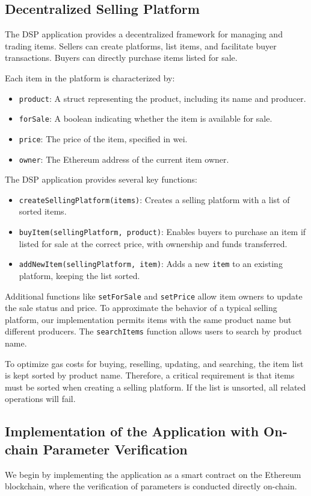 \documentclass[runningheads]{llncs}
\begin{document}
\subsection{Decentralized Selling Platform}
The DSP application provides a decentralized framework for managing and trading items. Sellers can create platforms, list items, and facilitate buyer transactions. Buyers can directly purchase items listed for sale.

Each item in the platform is characterized by:
\begin{itemize}
    \item \texttt{product}: A struct representing the product, including its name and producer.
    \item \texttt{forSale}: A boolean indicating whether the item is available for sale.
    \item \texttt{price}: The price of the item, specified in wei.
    \item \texttt{owner}: The Ethereum address of the current item owner.
\end{itemize}
The DSP application provides several key functions:
\begin{itemize}
    \item \texttt{createSellingPlatform(items)}: Creates a selling platform with a list of sorted items.
    \item \texttt{buyItem(sellingPlatform, product)}: Enables buyers to purchase an item if listed for sale at the correct price, with ownership and funds transferred.
    \item \texttt{addNewItem(sellingPlatform, item)}: Adds a new \texttt{item} to an existing platform, keeping the list sorted.
\end{itemize}
Additional functions like \texttt{setForSale} and \texttt{setPrice} allow item owners to update the sale status and price. To approximate the behavior of a typical selling platform, our implementation permits items with the same product name but different producers. The \texttt{searchItems} function allows users to search by product name.

To optimize gas costs for buying, reselling, updating, and searching, the item list is kept sorted by product name. Therefore, a critical requirement is that items must be sorted when creating a selling platform. If the list is unsorted, all related operations will fail.
\subsection{Implementation of the Application with On-chain Parameter Verification}
We begin by implementing the application as a smart contract on the Ethereum blockchain, where the verification of parameters is conducted directly on-chain.
\end{document}
